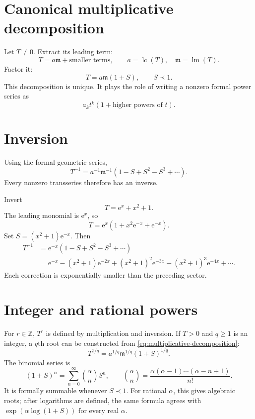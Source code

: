 \documentclass[11pt,openany]{book}
\theoremstyle{definition}
\theoremstyle{plain}
\theoremstyle{remark}
\newcommand{\Z}{\mathbb{Z}}
\newcommand{\m}{\mathfrak{m}}
\newcommand{\e}{\mathrm{e}}
\newcommand{\precdom}{\prec}
\DeclareMathOperator{\lm}{lm}
\DeclareMathOperator{\lc}{lc}
\begin{document}
\section{Canonical multiplicative decomposition}

Let $T\ne0$. Extract its leading term:
\[
 T=a\m+\text{smaller terms},
 \qquad a=\lc(T),\quad \m=\lm(T).
\]
Factor it:
\begin{equation}\label{eq:multiplicative-decomposition}
 T=a\m(1+S),
 \qquad S\precdom1.
\end{equation}
This decomposition is unique. It plays the role of writing a nonzero formal power series as
\[
 a_kt^k(1+\text{higher powers of }t).
\]

\section{Inversion}

Using the formal geometric series,
\begin{equation}\label{eq:inverse-general}
 T^{-1}=a^{-1}\m^{-1}
 \left(1-S+S^2-S^3+\cdots\right).
\end{equation}
Every nonzero transseries therefore has an inverse.

\begin{workedbox}
Invert
\[
 T=\e^x+x^2+1.
\]
The leading monomial is $\e^x$, so
\[
 T=\e^x\left(1+x^2\e^{-x}+\e^{-x}\right).
\]
Set $S=(x^2+1)\e^{-x}$. Then
\begin{align*}
 T^{-1}
 & =\e^{-x}\left(1-S+S^2-S^3+\cdots\right)\\
 & =\e^{-x}-(x^2+1)\e^{-2x}
 +(x^2+1)^2\e^{-3x}
 -(x^2+1)^3\e^{-4x}+\cdots.
\end{align*}
Each correction is exponentially smaller than the preceding sector.
\end{workedbox}

\section{Integer and rational powers}

For $r\in\Z$, $T^r$ is defined by multiplication and inversion. If $T>0$ and $q\ge1$ is an integer, a $q$th root can be constructed from \cref{eq:multiplicative-decomposition}:
\[
 T^{1/q}=a^{1/q}\m^{1/q}(1+S)^{1/q}.
\]
The binomial series is
\begin{equation}\label{eq:binomial-formal}
 (1+S)^\alpha
 =\sum_{n=0}^{\infty}\binom{\alpha}{n}S^n,
 \qquad
 \binom{\alpha}{n}
 =\frac{\alpha(\alpha-1)\cdots(\alpha-n+1)}{n!}.
\end{equation}
It is formally summable whenever $S\precdom1$. For rational $\alpha$, this gives algebraic roots; after logarithms are defined, the same formula agrees with $\exp(\alpha\log(1+S))$ for every real $\alpha$.
\end{document}
